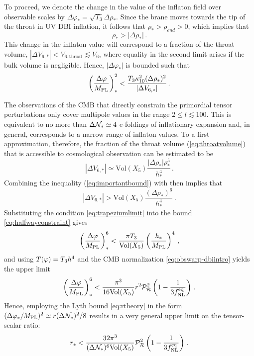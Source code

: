 To proceed, we denote the change in the value of the inflaton field over 
observable scales by 
$\Delta  \varphi _{*} = \sqrt{T_3} \Delta \rho_{*}$. 
Since the brane moves towards the tip of the throat in 
UV DBI inflation, it follows that $\rho_{*} > \rho_{end} >0$, which 
implies that  
% 
\begin{equation}
\label{eq:importantbound}
\rho_{*} > |\Delta \rho _{*}| \,.
\end{equation}
% 
This change in the inflaton value will correspond 
to a fraction of the throat volume, 
$| \Delta V _{6,*}|  < {V_{6,\mathrm{throat}}} \lesssim {V_6} $,
where equality in the second limit arises if
the bulk volume is negligible. Hence, 
$| \Delta \varphi_* |$ is bounded such that  
% 
\begin{equation}
\label{eq:halfwayconstraint}
\left( \frac{\Delta \varphi}{M_{\mathrm{PL}}} \right)^2_{*} < 
\frac{T_3 \kappa_{10}^2 (\Delta \rho_{*})^2}{|\Delta V_{6,*}|} \,.
\end{equation}
%  


The observations of the CMB 
that directly constrain the primordial tensor perturbations only 
cover multipole values in the range $2 \le l \lesssim 100$. 
This is equivalent to no more than ${\Delta \mathcal{N}_{*}} \simeq {4}$ 
e-foldings of inflationary expansion and, in general,   
corresponds to a narrow range of inflaton values. 
To a first approximation, therefore, the fraction of the throat volume 
(\ref{eq:throatvolume}) that is accessible to cosmological 
observation can be estimated to be 
% 
\begin{equation}
\label{eq:trapezium}
| \Delta V_{6,*} | \simeq \mathrm{Vol}(X_5) 
\frac{|\Delta \rho_*| \rho^5_{*}}{h^{4}_{*}} \,.
\end{equation}
% 
Combining the inequality (\ref{eq:importantbound}) with  
then implies that 
% 
\begin{equation}
\label{eq:trapeziumlimit}
|\Delta V _{6,*}| > \mathrm{Vol}(X_5) 
\frac{(\Delta \rho_* )^6}{h^{4}_*}  \,.
\end{equation}
% 
Substituting the condition \eqref{eq:trapeziumlimit} into the bound
\eqref{eq:halfwayconstraint} gives
\begin{equation}
\label{eq:hbound6}
\left( \frac{\Delta \varphi}{M_{\mathrm{PL}}} \right)_*^6 < \frac{\pi T_3}{\mathrm{Vol} (X_5)} 
\left( \frac{h_*}{M_{\mathrm{PL}}} \right)^4 \,,
\end{equation}   
and using $T(\varphi) = T_3 h^4$ and the CMB normalization
\eqref{eq:obswarp-dbiintro} yields the upper limit
% 
\begin{equation}
\label{eq:boundpower6}
\left( \frac{\Delta \varphi}{M_{\mathrm{PL}}} \right)^6_{*} 
< \frac{\pi^3}{16\mathrm{Vol}(X_5)} r^2 \mathcal{P}_{\mathcal{R}}^2  
\left( 1- \frac{1}{3f_{\mathrm{NL}}^{\mathrm{eq}}} \right)  \,.
\end{equation}
% 
Hence, employing the Lyth bound \eqref{eq:rtheory} in the form
$(\Delta \varphi_* / M_{\mathrm{PL}} )^2 \simeq 
r (\Delta \mathcal{N}_*)^2 /8$  
results in a very general upper limit on the tensor-scalar ratio: 
% 
\begin{equation}
\label{eq:generalbound}
r_{*} < \frac{32 \pi^3}{(\Delta \mathcal{N}_*)^6 \mathrm{Vol}(X_5)} 
\mathcal{P}_{\mathcal{R}}^2  \left( 1- \frac{1}{3f_{\mathrm{NL}}^{\mathrm{eq}}} \right) \,.
\end{equation}
% 


